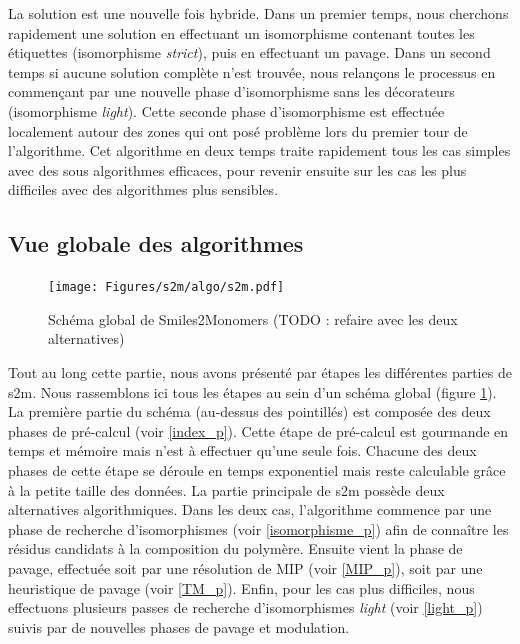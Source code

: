 La solution est une nouvelle fois hybride.
Dans un premier temps, nous cherchons rapidement une solution en effectuant un
isomorphisme contenant toutes les étiquettes (isomorphisme {\em strict}), puis en effectuant un pavage.
Dans un second temps si aucune solution complète n'est trouvée, nous relançons le processus en commençant par
une nouvelle phase d'isomorphisme sans les décorateurs (isomorphisme \textit{light}).
Cette seconde phase d'isomorphisme est effectuée localement autour des zones qui ont posé problème lors du premier tour de 
l'algorithme.
Cet algorithme en deux temps traite rapidement tous les cas simples avec des sous algorithmes efficaces, pour revenir ensuite sur les cas les plus difficiles avec des algorithmes plus sensibles.

\subsection{Vue globale des algorithmes}

\begin{figure}
  \begin{center}
    \texttt{[image: Figures/s2m/algo/s2m.pdf]}
    \caption{\label{global_s2m}Schéma global de Smiles2Monomers (TODO : refaire avec les deux alternatives)}
  \end{center}
\end{figure}

Tout au long cette partie, nous avons présenté par étapes les différentes parties de s2m.
Nous rassemblons ici tous les étapes au sein d'un schéma global (figure \ref{global_s2m}).
La première partie du schéma (au-dessus des pointillés) est composée des deux phases de pré-calcul (voir \ref{index_p}).
Cette étape de pré-calcul est gourmande en temps et mémoire mais n'est à effectuer qu'une seule fois.
Chacune des deux phases de cette étape se déroule en temps exponentiel mais reste calculable grâce à la petite taille des
données.
La partie principale de s2m possède deux alternatives algorithmiques.
Dans les deux cas, l'algorithme commence par une phase de recherche d'isomorphismes (voir \ref{isomorphisme_p}) afin de connaître les résidus candidats à la composition du polymère.
Ensuite vient la phase de pavage, effectuée soit par une résolution de MIP (voir \ref{MIP_p}), soit par une heuristique de pavage (voir \ref{TM_p}).
Enfin, pour les cas plus difficiles, nous effectuons plusieurs passes de recherche d'isomorphismes \textit{light} (voir \ref{light_p}) suivis par de nouvelles phases de pavage et modulation.

